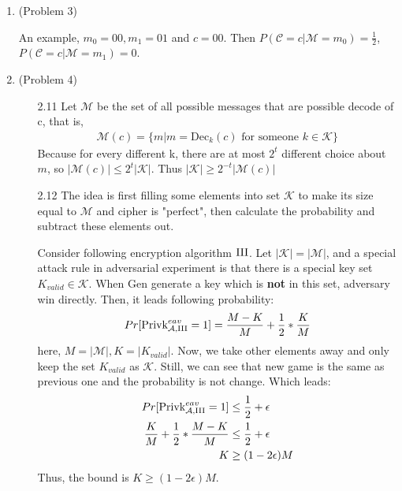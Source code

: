 \normalfont\documentclass[letterpaper,11pt]{article}
\begin{document}
\begin{enumerate}
\item (Problem 3)\par
	An example, $m_0=00, m_1 = 01$ and $c = 00$. Then $P(\mathcal{C}=c|\mathcal{M}=m_0) = \frac{1}{2}$, $P(\mathcal{C}=c|\mathcal{M}=m_1) = 0$.
\item (Problem 4)\par
	\begin{enumerate}
		\item[2.11]
			Let $\mathcal{M}$ be the set of all possible messages that are possible decode of c, that is,
			\begin{align*}
			\mathcal{M}(c) = \{m| m  = \text{Dec}_k(c) \text{ for someone }k \in \mathcal{K}\}
			\end{align*}
			Because for every different k, there are at most $2^t$ different choice about $m$, so $|\mathcal{M}(c)| \leq 2^t|\mathcal{K}|$. Thus $ |\mathcal{K}| \geq 2^{-t}|\mathcal{M}(c)|$
		\item[2.12]
			The idea is first filling some elements into set $\mathcal{K}$ to make its size equal to $\mathcal{M}$ and cipher is "perfect", then calculate the probability and subtract these elements out.\par
			Consider following encryption algorithm $\RN{3}$. Let $|\mathcal{K}| = |\mathcal{M}|$, and a special attack rule in adversarial experiment is that there is a special key set $K_{valid} \in \mathcal{K}$. When Gen generate a key which is \textbf{not} in this set, adversary win directly. Then, it leads following probability:
			\begin{align*} 
				Pr[\text{Privk}^{eav}_{\mathcal{A},\RN{3}} = 1] = \frac{M - K}{M} + \frac{1}{2} * \frac{K}{M}
			\end{align*}
			here, $M = |\mathcal{M}|, K = |K_{valid}|$. Now, we take other elements away and only keep the set $K_{valid}$ as $\mathcal{K}$. Still, we can see that new game is the same as previous one and the probability is not change. Which leads:
			\begin{align*} 
			Pr[\text{Privk}^{eav}_{\mathcal{A},\RN{3}} = 1]&\leq \frac{1}{2} + \epsilon\\
				\frac{K}{M} + \frac{1}{2} * \frac{M - K}{M} &\leq \frac{1}{2} + \epsilon\\
				K &\geq (1 - 2\epsilon)M
			\end{align*}
			Thus, the bound is $K \geq (1 - 2\epsilon)M$.
	\end{enumerate}
\end{enumerate}
\end{document}
